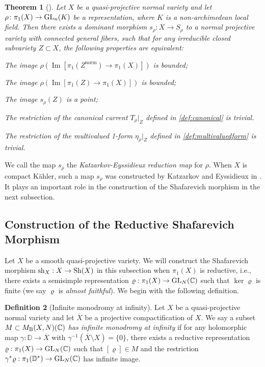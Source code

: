 \documentclass[english]{amsproc}
\theoremstyle{plain}
\newtheorem{thm}{Theorem}[section]
\theoremstyle{definition}
\newtheorem{dfn}[thm]{Definition}
\theoremstyle{remark}
\theoremstyle{plain}
\numberwithin{equation}{thm} %
\newcommand{\bC}{\mathbb{C}}
\newcommand{\bD}{\mathbb{D}}
\newcommand{\GL}{{\rm GL}}
\begin{document}
\begin{thm}[{\cite[Theorem E]{CDY22}}]\label{thm:KE}
	Let $X$ be a  quasi-projective normal variety and let $\rho \colon \pi_1(X) \to \GL_n(K)$ be a   representation, where $K$ is a non-archimedean local field. Then there exists a  dominant morphism $s_\rho \colon X \to S_\rho$ to a normal projective variety with connected general fibers, such that for any irreducible closed subvariety $Z \subset X$, the following properties are equivalent: 
	\begin{thmlist}
		\item \label{item:KZ1} The image $\rho(\operatorname{Im}[\pi_1(Z^{\mathrm{norm}}) \to \pi_1(X)])$ is bounded;
		\item \label{item:KZ3} The image $\rho(\operatorname{Im}[\pi_1(Z) \to \pi_1(X)])$ is bounded;
		\item \label{item:KZ2} The image $s_\rho(Z)$ is a point;
		\item \label{item:KZ4} The restriction of the canonical current $T_\rho|_Z$ defined in \cref{def:canonical} is trivial.
		\item  \label{item:KZ5} The restriction of the multivalued 1-form $\eta_\rho|_Z$ defined in \cref{def:multivaluedform} is trivial.
	\end{thmlist}   
\end{thm} 
We call the map $s_\rho$ the \emph{Katzarkov-Eyssidieux reduction map} for $\rho$. When $X$ is compact K\"ahler, such a map $s_\rho$ was constructed by Katzarkov and Eyssidieux in \cite{Eys04}. It plays an important role in the construction of the Shafarevich morphism in the next subsection. 
\subsection{Construction of the Reductive Shafarevich Morphism}\label{sec:sha mor}

Let $X$ be a smooth quasi-projective variety. We will construct the Shafarevich morphism ${\rm sh}_X:X\to {\rm Sh}(X)$ in this subsection when $\pi_1(X)$ is reductive, i.e.,   there exists a semisimple representation $\varrho:\pi_1(X)\to \GL_N(\bC)$ such that $\ker\varrho$ is finite (we say $\varrho$ is \emph{almost faithful}).  We begin with the following definition.

\begin{dfn}[Infinite monodromy at infinity]\label{def:monodromy}
	Let $X$ be a quasi-projective normal variety and let $\overline{X}$ be a projective compactification of $X$. We say a subset $M\subset M_{\rm B}(X,N)(\bC)$ \emph{has infinite monodromy at infinity} if for any holomorphic map $\gamma:\bD\to \overline{X}$ with $\gamma^{-1}(\overline{X}\setminus X)=\{0\}$, there exists a reductive representation $\varrho:\pi_1(X)\to \GL_N(\bC)$ such that $[\varrho]\in M$ and the restriction $\gamma^*\varrho:\pi_1(\bD^*)\to \GL_N(\bC)$ has infinite image.
\end{dfn}
\end{document}
